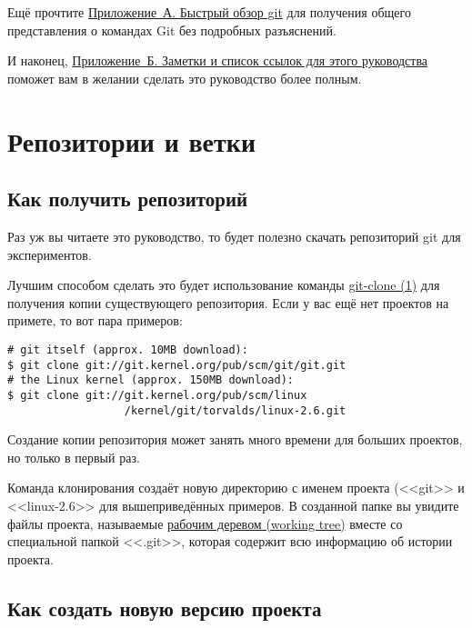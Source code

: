 \documentclass[a4paper, 11pt]{report}
\begin{document}
Ещё прочтите \href{#appendixa}{Приложение~А. Быстрый обзор git} для получения
общего представления о командах Git без подробных разъяснений.

И наконец, \href{#appendixb}{Приложение~Б. Заметки и список ссылок для этого
руководства} поможет вам в желании сделать это руководство более
полным.
%
%
\chapter{Репозитории и ветки}
\hypertarget{#chapter1}{}

\section{Как получить репозиторий}

Раз уж вы читаете это руководство, то будет полезно скачать репозиторий git для 
экспериментов.

Лучшим способом сделать это будет использование команды
\href{http://www.kernel.org/pub/software/scm/git/docs/git-clone.html}{git-clone (1)}
для получения копии существующего репозитория. Если у вас ещё нет проектов на 
примете, то вот пара примеров:

\begin{lstlisting}
# git itself (approx. 10MB download):
$ git clone git://git.kernel.org/pub/scm/git/git.git
# the Linux kernel (approx. 150MB download):
$ git clone git://git.kernel.org/pub/scm/linux
                  /kernel/git/torvalds/linux-2.6.git
\end{lstlisting}

Создание копии репозитория может занять много времени для больших проектов, но 
только в первый раз.

Команда клонирования создаёт новую директорию с именем проекта (<<git>> и <<linux-2.6>>
для вышеприведённых примеров. В созданной папке вы увидите файлы проекта, называемые
\href{#def_working_tree}{рабочим деревом (working tree)} вместе со специальной папкой 
<<.git>>, которая содержит всю информацию об истории проекта.



\section{Как создать новую версию проекта}
\end{document}
